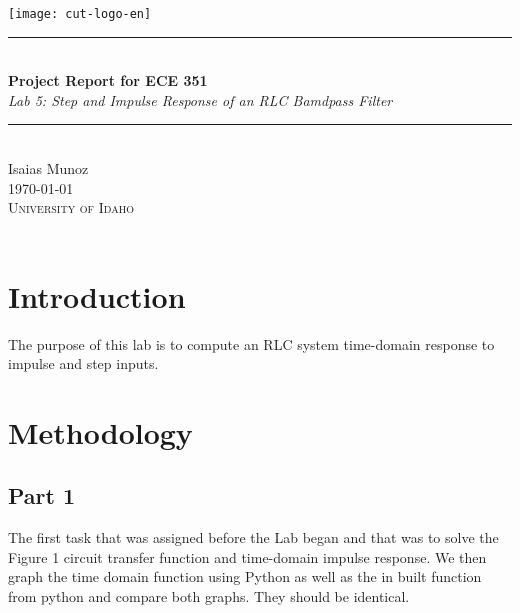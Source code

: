 \documentclass[12pt,a4paper]{article}
\newcommand{\HRule}{\rule{\linewidth}{0.5mm}}
\begin{document}
\begin{titlepage}
\begin{center}
\texttt{[image: cut-logo-en]}~\\[2cm]
\HRule \\[0.4cm]
{ \LARGE 
  \textbf{Project Report for ECE 351}\\[0.4cm]
  \emph{Lab 5: Step and Impulse Response of an RLC Bamdpass Filter}\\[0.4cm]
}
\HRule \\[1.5cm]
{ \large
  Isaias Munoz  \\[0.1cm]
  \today\\[0.1cm]
}
\vfill
\textsc{\Large University of Idaho}\\
\\
 
\end{center}
\end{titlepage}
\newpage
\tableofcontents
{}
\newpage
\setcounter{page}{1}
\section{Introduction}\label{sec:intro}

The purpose of this lab is to compute an RLC system time-domain response to impulse and step inputs.





\section{Methodology}\label{sec:meth}
\subsection{Part 1}
The first task that was assigned before the Lab began and that was to solve the Figure 1 circuit transfer function and time-domain impulse response. We then graph the time domain function using Python as well as the in built function from python and compare both graphs. They should be identical. 
\end{document}
